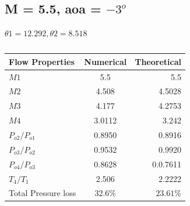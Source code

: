 \documentclass{article}
\begin{document}
\subsection*{M = 5.5, aoa = $-3^o$}
$\theta1 = 12.292, \theta2 = 8.518$
\begin{table}[h]
  \centering
  \caption{}
  \label{tab:table1}
  \begin{tabular}{l||c|r}
    Flow Properties & Numerical & Theoretical\\
    \hline
    $M1$ & 5.5 & 5.5\\
    \hline
    $M2$ & 4.508 & 4.5028\\
    \hline
    $M3$ & 4.177& 4.2753\\
    \hline
    $M4$ & 3.0112 & 3.242\\
    \hline
    $P_{o2}/P_{o1}$ & 0.8950 & 0.8916\\
    \hline
    $P_{o3}/P_{o2}$ & 0.9532 & 0.9920\\
    \hline
    $P_{o4}/P_{o3}$ & 0.8628 & 0.0.7611\\
    \hline
    $T_{4}/T_{1}$ & 2.506 & 2.2222\\
    \hline
    Total Pressure loss & $32.6\%$ & $23.61\%$\\
    
  \end{tabular}
\end{table}

\newpage
\end{document}
